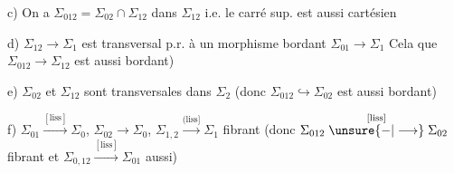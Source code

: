 c) 
On a $\Sigma_{012}=\Sigma_{02}\cap\Sigma_{12}$ dans $\Sigma_{12}$ i.e.
le carré sup. est aussi cartésien

d) $\Sigma_{12}\longrightarrow\Sigma_1$ est transversal p.r. à
un morphisme bordant $\Sigma_{01}\longrightarrow\Sigma_1$ Cela  que
$\Sigma_{012}\longrightarrow\Sigma_{12}$ est aussi bordant)

e) $\Sigma_{02}$ et $\Sigma_{12}$ sont  transversales dans $\Sigma_2$
(donc $\Sigma_{012}\hookrightarrow\Sigma_{02}$ est aussi bordant)

f) $\Sigma_{01}\xrightarrow{[\mathrm{liss}]}\Sigma_0$, $\Sigma_{02}\longrightarrow\Sigma_0$, $\Sigma_{1,2}\xrightarrow{(\mathrm{liss}]}\Sigma_1$ fibrant
(donc $\Sigma_{012}\overset{[\mathrm{liss}]}{\mathrel{\unsure{-|\longrightarrow}}}\Sigma_{02}$ fibrant  et $\Sigma_{0,12}\xrightarrow{[\mathrm{liss}]}\Sigma_{01}$ aussi)

